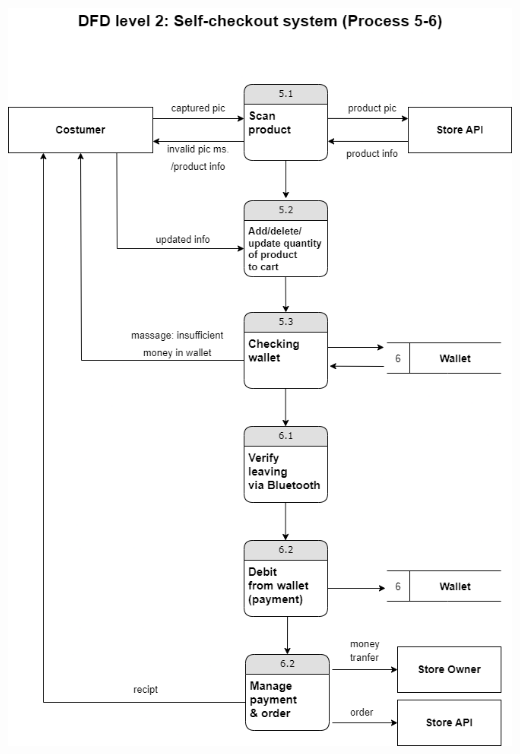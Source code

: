 \begin{center}
    \includegraphics[scale=0.25]{pic/dataflow_p5.png}\\
    \vspace{2cm}

\end{center}
